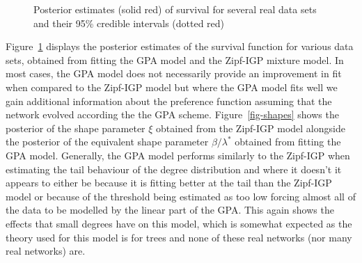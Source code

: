 \documentclass[
  sn-basic,
]{sn-jnl}
\theoremstyle{plain}
\theoremstyle{remark}
\begin{document}
\begin{figure}[H]


\caption{\label{fig-real1}Posterior estimates (solid red) of survival
for several real data sets and their 95\% credible intervals (dotted
red)}

\end{figure}%

Figure~\ref{fig-real1} displays the posterior estimates of the survival
function for various data sets, obtained from fitting the GPA model and
the Zipf-IGP mixture model. In most cases, the GPA model does not
necessarily provide an improvement in fit when compared to the Zipf-IGP
model but where the GPA model fits well we gain additional information
about the preference function assuming that the network evolved
according the the GPA scheme. Figure~\ref{fig-shapes} shows the
posterior of the shape parameter \(\xi\) obtained from the Zipf-IGP
model alongside the posterior of the equivalent shape parameter
\(\beta/\lambda^*\) obtained from fitting the GPA model. Generally, the
GPA model performs similarly to the Zipf-IGP when estimating the tail
behaviour of the degree distribution and where it doesn't it appears to
either be because it is fitting better at the tail than the Zipf-IGP
model or because of the threshold being estimated as too low forcing
almost all of the data to be modelled by the linear part of the GPA.
This again shows the effects that small degrees have on this model,
which is somewhat expected as the theory used for this model is for
trees and none of these real networks (nor many real networks) are.
\end{document}
